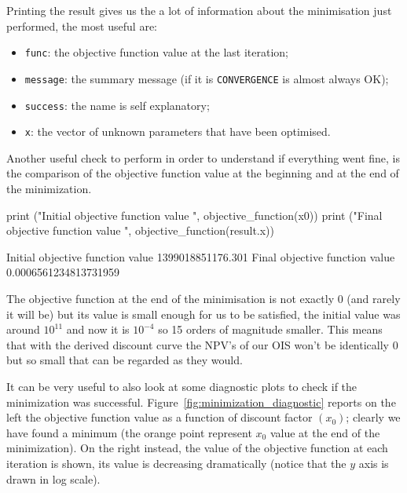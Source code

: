 Printing the result gives us the a lot of information about the minimisation just performed, the most useful are:
\begin{itemize}
\item \texttt{func}: the objective function value at the last iteration;
\item \texttt{message}: the summary message (if it is \texttt{CONVERGENCE} is almost always OK);
\item \texttt{success}: the name is self explanatory;
\item \texttt{x}: the vector of unknown parameters that have been optimised.
\end{itemize}

Another useful check to perform in order to understand if everything went fine, is the comparison of the objective function value at the beginning and at the end of the minimization.

\begin{ipython}
print ("Initial objective function value ", objective_function(x0))
print ("Final objective function value ", objective_function(result.x))
\end{ipython}
\begin{ioutput}
Initial objective function value  1399018851176.301
Final objective function value  0.0006561234813731959
\end{ioutput}
The objective function at the end of the minimisation is not exactly 0 (and rarely it will be) but its value is small enough for us to be satisfied, the initial value was around $10^{11}$ and now it is $10^{-4}$ so 15 orders of magnitude smaller. This means that with the derived discount curve the NPV's of our OIS won't be identically 0 but so small that can be regarded as they would.

It can be very useful to also look at some diagnostic plots to check if the minimization was successful. Figure~\ref{fig:minimization_diagnostic} reports on the left the objective function value as a function of discount factor $(x_0)$; clearly we have found a minimum (the orange point represent $x_0$ value at the end of the minimization). On the right instead, the value of the objective function at each iteration is shown, its value is decreasing dramatically (notice that the $y$ axis is drawn in log scale).

